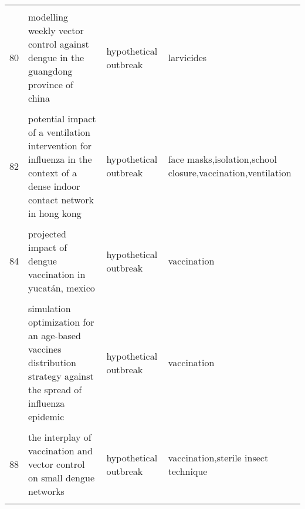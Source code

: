 \documentclass[
]{article}
\begin{document}
\begin{landscape}
\begin{longtable}{l>{\raggedright\arraybackslash}p{3cm}l>{\raggedright\arraybackslash}p{8cm}}
\cellcolor{gray!6}{79} & \cellcolor{gray!6}{modeling the spread of polio in an ipv-vaccinated population: lessons learned from the 2013 silent outbreak in southern israel} & \cellcolor{gray!6}{real outbreak} & \cellcolor{gray!6}{vaccination}\\
80 & modelling weekly vector control against dengue in the guangdong province of china & hypothetical outbreak & larvicides\\
\addlinespace
\cellcolor{gray!6}{81} & \cellcolor{gray!6}{optimal control strategies for the spread of ebola in west africa} & \cellcolor{gray!6}{hypothetical outbreak} & \cellcolor{gray!6}{education,treatment,control the propagation,reduce the number of susceptible and infected and simultaneously increase recovered}\\
82 & potential impact of a ventilation intervention for influenza in the context of a dense indoor contact network in hong kong & hypothetical outbreak & face masks,isolation,school closure,vaccination,ventilation\\
\cellcolor{gray!6}{83} & \cellcolor{gray!6}{predicting and evaluating the epidemic trend of ebola virus disease in the 2014-2015 outbreak and the effects of intervention measures} & \cellcolor{gray!6}{real outbreak} & \cellcolor{gray!6}{isolation,safe burial,vaccination,protected sex with condoms,early detection and diagnosis,preventing importation}\\
84 & projected impact of dengue vaccination in yucatán, mexico & hypothetical outbreak & vaccination\\
\cellcolor{gray!6}{85} & \cellcolor{gray!6}{seasonality and the effectiveness of mass vaccination} & \cellcolor{gray!6}{hypothetical outbreak} & \cellcolor{gray!6}{vaccination}\\
\addlinespace
86 & simulation optimization for an age-based vaccines distribution strategy against the spread of influenza epidemic & hypothetical outbreak & vaccination\\
\cellcolor{gray!6}{87} & \cellcolor{gray!6}{spatiotemporal dynamics of the ebola epidemic in guinea and implications for vaccination and disease elimination: a computational modeling analysis} & \cellcolor{gray!6}{real outbreak} & \cellcolor{gray!6}{contact tracing,safe burial,vaccination,ebola treatment units}\\
88 & the interplay of vaccination and vector control on small dengue networks & hypothetical outbreak & vaccination,sterile insect technique\\
\cellcolor{gray!6}{89} & \cellcolor{gray!6}{an epidemic patchy model with entry–exit screening} & \cellcolor{gray!6}{real outbreak} & \cellcolor{gray!6}{screening}\\

\end{longtable}
\end{landscape}
\end{document}
